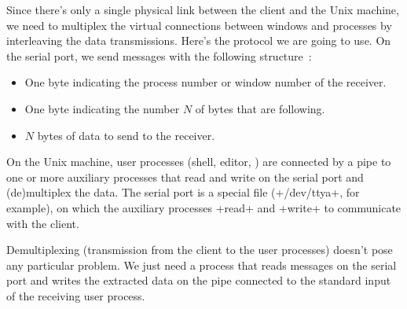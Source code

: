 Since there's only a single physical link between the client and the
Unix machine, we need to multiplex the virtual connections between
windows and processes by interleaving the data transmissions.
Here's the protocol we are going to use. On the serial port, we send
messages with the following structure~: 
%
\begin{itemize}
\item One byte indicating the process number or window number of the receiver.
\item One byte indicating the number $N$ of bytes that are following.
\item $N$ bytes of data to send to the receiver.
\end{itemize}
% 
On the Unix machine, user processes (shell, editor, \etc) are
connected by a pipe to one or more auxiliary processes that read and
write on the serial port and (de)multiplex the data. The serial port
is a special file (\ml+/dev/ttya+, for example), on which the
auxiliary processes \ml+read+ and \ml+write+ to communicate with the 
client.

Demultiplexing (transmission from the client to the user processes)
doesn't pose any particular problem. We just need a process that reads
messages on the serial port and writes the extracted data on the pipe
connected to the standard input of the receiving user process.
%

